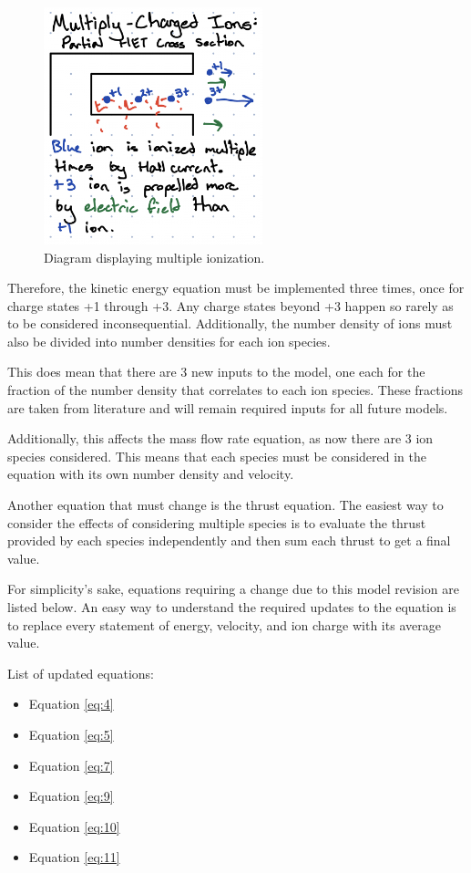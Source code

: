 \documentclass[letterpaper, 10 pt, conference]{ieeeconf}  %
\begin{document}
\begin{figure}[H]
      \centering
      \includegraphics[width=2.5in]{Images/m_cha.png}
      \caption{Diagram displaying multiple ionization.}
      \label{fig:5}
\end{figure}

Therefore, the kinetic energy equation must be implemented three times, once for charge states +1 through +3. Any charge states beyond +3 happen so rarely as to be considered inconsequential. Additionally, the number density of ions must also be divided into number densities for each ion species. 

This does mean that there are 3 new inputs to the model, one each for the fraction of the number density that correlates to each ion species. These fractions are taken from literature \cite{c1} and will remain required inputs for all future models.

Additionally, this affects the mass flow rate equation, as now there are 3 ion species considered. This means that each species must be considered in the equation with its own number density and velocity.

Another equation that must change is the thrust equation. The easiest way to consider the effects of considering multiple species is to evaluate the thrust provided by each species independently and then sum each thrust to get a final value.

For simplicity's sake, equations requiring a change due to this model revision are listed below. An easy way to understand the required updates to the equation is to replace every statement of energy, velocity, and ion charge with its average value.

\BlankLine
List of updated equations:
\begin{itemize}
    \item Equation \ref{eq:4}
    \item Equation \ref{eq:5}
    \item Equation \ref{eq:7}
    \item Equation \ref{eq:9}
    \item Equation \ref{eq:10}
    \item Equation \ref{eq:11}
\end{itemize}
\end{document}
